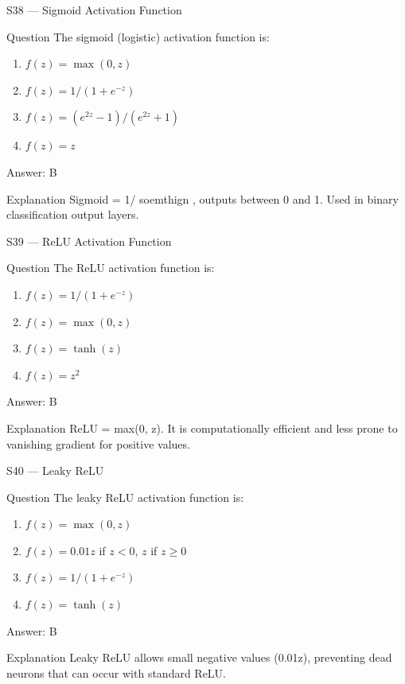 \documentclass[aspectratio=169,8pt]{beamer}
\begin{document}
	\begin{frame}{S38 --- Sigmoid Activation Function}
		\begin{block}{Question}
			The sigmoid (logistic) activation function is:
			\begin{enumerate}
				\item $f(z) = \max(0, z)$
				\item $f(z) = 1/(1 + e^{-z})$
				\item $f(z) = (e^{2z} - 1)/(e^{2z} + 1)$
				\item $f(z) = z$
			\end{enumerate}
		\end{block}
		\begin{exampleblock}{Answer: B}\end{exampleblock}
		\begin{block}{Explanation}
			Sigmoid = 1/ soemthign , outputs between 0 and 1. Used in binary classification output layers.
		\end{block}
	\end{frame}
	
	\begin{frame}{S39 --- ReLU Activation Function}
		\begin{block}{Question}
			The ReLU activation function is:
			\begin{enumerate}
				\item $f(z) = 1/(1 + e^{-z})$
				\item $f(z) = \max(0, z)$
				\item $f(z) = \tanh(z)$
				\item $f(z) = z^2$
			\end{enumerate}
		\end{block}
		\begin{exampleblock}{Answer: B}\end{exampleblock}
		\begin{block}{Explanation}
			ReLU = max(0, z). It is computationally efficient and less prone to vanishing gradient for positive values.
		\end{block}
	\end{frame}
	
	\begin{frame}{S40 --- Leaky ReLU}
		\begin{block}{Question}
			The leaky ReLU activation function is:
			\begin{enumerate}
				\item $f(z) = \max(0, z)$
				\item $f(z) = 0.01z$ if $z < 0$, $z$ if $z \geq 0$
				\item $f(z) = 1/(1+e^{-z})$
				\item $f(z) = \tanh(z)$
			\end{enumerate}
		\end{block}
		\begin{exampleblock}{Answer: B}\end{exampleblock}
		\begin{block}{Explanation}
			Leaky ReLU allows small negative values (0.01z), preventing dead neurons that can occur with standard ReLU.
		\end{block}
	\end{frame}
	
\end{document}
